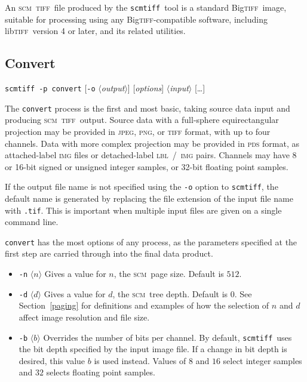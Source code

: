 \documentclass[oneside,10pt]{memoir}
\newcommand{\scm}     {\textsc{scm}}
\newcommand{\tiff}    {\textsc{tiff}}
\newcommand{\bigtiff} {Big\textsc{tiff}}
\newcommand{\libtiff} {lib\textsc{tiff}}
\newcommand{\scmtiff} {\texttt{scmtiff}}
\newcommand{\inangles}[1]{$\langle$#1$\rangle$}
\newenvironment{optionlist}
  {\setlength{\leftmargini}{1in}\begin{itemize}}{\end{itemize}}
\begin{document}
\begin{Spacing}{1.1}
An \scm\ \tiff\ file produced by the \scmtiff\ tool is a standard \bigtiff\ image, suitable for processing using any \bigtiff-compatible software, including \libtiff\ version 4 or later, and its related utilities.

\subsection{Convert}

\noindent\scmtiff\ \texttt{-p convert} [\texttt{-o} \inangles{\textit{output}}] [\textit{options}] \inangles{\textit{input}} [\ldots]

\bigskip The \texttt{convert} process is the first and most basic, taking source data input and producing \scm\ \tiff\ output. Source data with a full-sphere equirectangular projection may be provided in \textsc{jpeg}, \textsc{png}, or \textsc{tiff} format, with up to four channels. Data with more complex projection may be provided in \textsc{pds} format, as attached-label \textsc{img} files or detached-label \textsc{lbl}~/~\textsc{img} pairs. Channels may have 8 or 16-bit signed or unsigned integer samples, or 32-bit floating point samples.

If the output file name is not specified using the \texttt{-o} option to \scmtiff, the default name is generated by replacing the file extension of the input file name with \texttt{.tif}. This is important when multiple input files are given on a single command line.

\texttt{convert} has the most options of any process, as the parameters specified at the first step are carried through into the final data product.

\begin{optionlist}
\item[\texttt{-n} \inangles{$n$}] Gives a value for $n$, the \scm\ page size. Default is $512$.

\item[\texttt{-d} \inangles{$d$}] Gives a value for $d$, the \scm\ tree depth. Default is $0$. See Section~\ref{paging} for definitions and examples of how the selection of $n$ and $d$ affect image resolution and file size.

\item[\texttt{-b} \inangles{$b$}] Overrides the number of bits per channel. By default, \scmtiff\ uses the bit depth specified by the input image file. If a change in bit depth is desired, this value $b$ is used instead. Values of $8$ and $16$ select integer samples and $32$ selects floating point samples.


\end{optionlist}
\end{Spacing}
\end{document}
